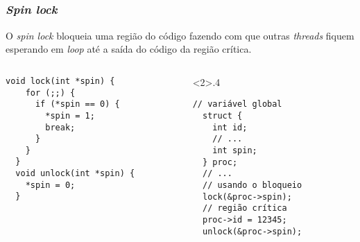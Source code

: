 
\subsection{\insertlecture}

\begin{frame}[fragile]
  \frametitle{{\em Spin lock}} \small O \alert{\em spin lock} bloqueia
  uma região do código fazendo com que outras {\em threads}
  fiquem esperando em {\em loop} até a saída do código da região crítica.\\
  \bigskip

  \begin{columns}
\begin{column}{.4\textwidth}
\begin{lstlisting}[framexleftmargin=5mm, frame=shadowbox,
    rulesepcolor=\color{red}]
  void lock(int *spin) {
    for (;;) {
      if (*spin == 0) {
        *spin = 1;
        break;
      }
    }
  }
  void unlock(int *spin) {
    *spin = 0;
  }
\end{lstlisting}
\end{column}
\begin{column}<2>{.4\textwidth}
  \begin{lstlisting}[framexleftmargin=5mm, frame=shadowbox,
    rulesepcolor=\color{blue}]
  // variável global
  struct {
    int id;
    // ...
    int spin;
  } proc;
  // ...
  // usando o bloqueio  
  lock(&proc->spin);
  // região crítica
  proc->id = 12345;
  unlock(&proc->spin);
\end{lstlisting}
\end{column}
  \end{columns}
\end{frame}

